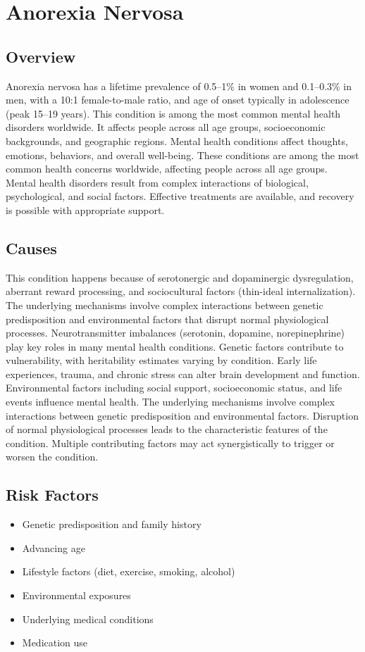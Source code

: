 \chapter{Anorexia Nervosa}
\label{sec:Anorexia Nervosa}

\section{Overview}
Anorexia nervosa has a lifetime prevalence of 0.5--1\% in women and 0.1--0.3\% in men, with a 10:1 female-to-male ratio, and age of onset typically in adolescence (peak 15--19 years). This condition is among the most common mental health disorders worldwide. It affects people across all age groups, socioeconomic backgrounds, and geographic regions. Mental health conditions affect thoughts, emotions, behaviors, and overall well-being. These conditions are among the most common health concerns worldwide, affecting people across all age groups. Mental health disorders result from complex interactions of biological, psychological, and social factors. Effective treatments are available, and recovery is possible with appropriate support.
\section{Causes}
This condition happens because of serotonergic and dopaminergic dysregulation, aberrant reward processing, and sociocultural factors (thin-ideal internalization). The underlying mechanisms involve complex interactions between genetic predisposition and environmental factors that disrupt normal physiological processes. Neurotransmitter imbalances (serotonin, dopamine, norepinephrine) play key roles in many mental health conditions. Genetic factors contribute to vulnerability, with heritability estimates varying by condition. Early life experiences, trauma, and chronic stress can alter brain development and function. Environmental factors including social support, socioeconomic status, and life events influence mental health. The underlying mechanisms involve complex interactions between genetic predisposition and environmental factors. Disruption of normal physiological processes leads to the characteristic features of the condition. Multiple contributing factors may act synergistically to trigger or worsen the condition.
\section{Risk Factors}
\begin{itemize}[noitemsep]
  \item Genetic predisposition and family history
  \item Advancing age
  \item Lifestyle factors (diet, exercise, smoking, alcohol)
  \item Environmental exposures
  \item Underlying medical conditions
  \item Medication use
\end{itemize}
